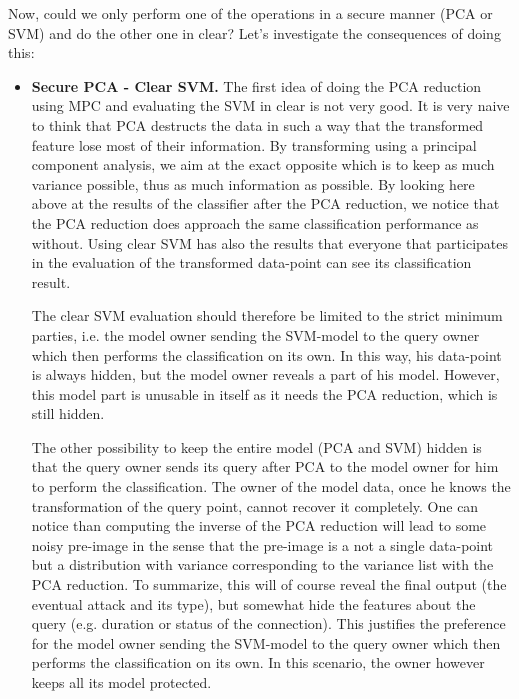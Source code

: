 Now, could we only perform one of the operations in a secure manner (PCA or SVM) and do the other one in clear? Let's investigate the consequences of doing this:
\begin{itemize}
    \item \textbf{Secure PCA - Clear SVM.} The first idea of doing the PCA reduction using MPC and evaluating the SVM in clear is not very good. It is very naive to think that PCA destructs the data in such a way that the transformed feature lose most of their information. By transforming using a principal component analysis, we aim at the exact opposite which is to keep as much variance possible, thus as much information as possible. By looking here above at the results of the classifier after the PCA reduction, we notice that the PCA reduction does approach the same classification performance as without. Using clear SVM has also the results that everyone that participates in the evaluation of the transformed data-point can see its classification result. 
    
    The clear SVM evaluation should therefore be limited to the strict minimum parties, i.e. the model owner sending the SVM-model to the query owner which then performs the classification on its own. In this way, his data-point is always hidden, but the model owner reveals a part of his model. However, this model part is unusable in itself as it needs the PCA reduction, which is still hidden.

    The other possibility to keep the entire model (PCA and SVM) hidden is that the query owner sends its query after PCA to the model owner for him to perform the classification. The owner of the model data, once he knows the transformation of the query point, cannot recover it completely. One can notice than computing the inverse of the PCA reduction will lead to some noisy pre-image in the sense that the pre-image is a not a single data-point but a distribution with variance corresponding to the variance list with the PCA reduction. To summarize, this will of course reveal the final output (the eventual attack and its type), but somewhat hide the features about the query (e.g. duration or status of the connection). This justifies the preference for the model owner sending the SVM-model to the query owner which then performs the classification on its own. In this scenario, the owner however keeps all its model protected.
    

\end{itemize}
